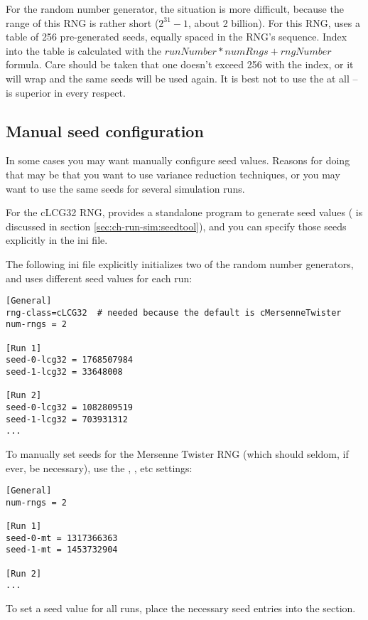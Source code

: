 For the  random number generator, the situation is more difficult,
because the range of this RNG is rather short ($2^31-1$, about 2 billion).
For this RNG, {\opp} uses a table of 256 pre-generated seeds, equally spaced
in the RNG's sequence. Index into the table is calculated with the
$runNumber*numRngs + rngNumber$ formula. Care should be taken that
one doesn't exceed 256 with the index, or it will wrap and the
same seeds will be used again. It is best not to use the 
at all --  is superior in every respect.


\subsection{Manual seed configuration}

In some cases you may want manually configure seed values.
Reasons for doing that may be that you want to use variance reduction
techniques, or you may want to use the same seeds for several simulation
runs.

For the cLCG32 RNG, {\opp} provides a standalone program to generate
seed values ( is discussed in section
\ref{sec:ch-run-sim:seedtool}), and you can specify those seeds explicitly
in the ini file.

The following ini file explicitly initializes two of the random
number generators, and uses different seed values for each run:

\begin{verbatim}
[General]
rng-class=cLCG32  # needed because the default is cMersenneTwister
num-rngs = 2

[Run 1]
seed-0-lcg32 = 1768507984
seed-1-lcg32 = 33648008

[Run 2]
seed-0-lcg32 = 1082809519
seed-1-lcg32 = 703931312
...
\end{verbatim}

To manually set seeds for the Mersenne Twister RNG (which should
seldom, if ever, be necessary), use the ,
, etc settings:

\begin{verbatim}
[General]
num-rngs = 2

[Run 1]
seed-0-mt = 1317366363
seed-1-mt = 1453732904

[Run 2]
...
\end{verbatim}

To set a seed value for all runs, place the necessary seed entries
into the \ttt{[General]} section.


